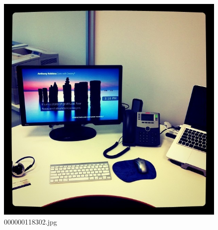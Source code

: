 \begin{figure}[h]
    \centering
    \includegraphics[width=0.8\linewidth]{../image set/hard/000000118302.jpg}
    \caption{000000118302.jpg}
\end{figure}
